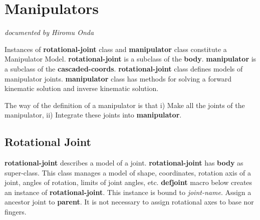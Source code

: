 \newpage
\section{\label{ManipulatorModel}Manipulators}
\hfill {\em documented by Hiromu Onda}


Instances of {\bf rotational-joint} class and {\bf manipulator} class 
constitute a Manipulator Model. {\bf rotational-joint} is a subclass of the 
{\bf body}. {\bf manipulator} is a subclass of the {\bf cascaded-coords}.
{\bf rotational-joint} class defines models of manipulator joints. 
{\bf manipulator} class has methods for solving a forward kinematic solution and 
inverse kinematic solution. 

The way of the definition of a manipulator is that i) Make all the 
joints of the manipulator, ii) Integrate these joints into {\bf manipulator}.


\subsection{
Rotational Joint
}

{\bf rotational-joint} describes a model of a joint. 
{\bf rotational-joint} has {\bf body} as super-class.
This class manages a model of shape, coordinates, rotation axis of a joint, 
angles of rotation, limits of joint angles, etc.
{\bf defjoint} macro below creates an instance of {\bf rotational-joint}.
This instance is bound to {\em joint-name}. Assign a ancestor joint to 
{\bf parent}. It is not necessary to assign rotational axes to base nor 
fingers. 

\begin{refdesc}
\end{refdesc}

